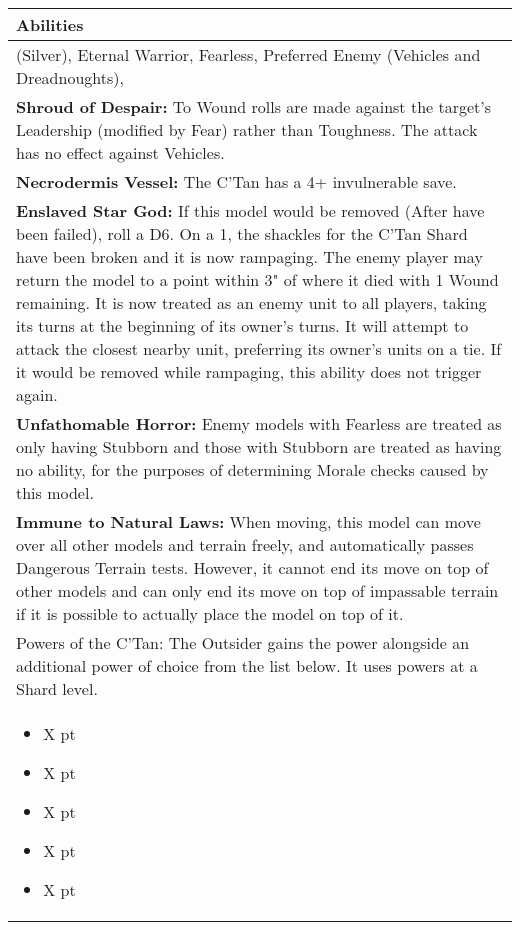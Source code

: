 \noindent
\begin{tabular}{||m{532pt}||}
	\hline
	Abilities \\
	\hline
	\quickref{Awakening Protocols} (Silver), Eternal Warrior, Fearless, Preferred Enemy (Vehicles and Dreadnoughts), \quickref{Reanimation Protocols} \\
	\textbf{Shroud of Despair:} To Wound rolls are made against the target's Leadership (modified by Fear) rather than Toughness. The attack has no effect against Vehicles. \\
	\textbf{Necrodermis Vessel:} The C'Tan has a 4+ invulnerable save. \\
	\textbf{Enslaved Star God:} If this model would be removed (After \quickref{Reanimation Protocols} have been failed), roll a D6. On a 1, the shackles for the C'Tan Shard have been broken and it is now rampaging. The enemy player may return the model to a point within 3" of where it died with 1 Wound remaining. It is now treated as an enemy unit to all players, taking its turns at the beginning of its owner's turns. It will attempt to attack the closest nearby unit, preferring its owner's units on a tie. If it would be removed while rampaging, this ability does not trigger again. \\
	\textbf{Unfathomable Horror:} Enemy models with Fearless are treated as only having Stubborn and those with Stubborn are treated as having no ability, for the purposes of determining Morale checks caused by this model. \\
	\textbf{Immune to Natural Laws:} When moving, this model can move over all other models and terrain freely, and automatically passes Dangerous Terrain tests. However, it cannot end its move on top of other models and can only end its move on top of impassable terrain if it is possible to actually place the model on top of it. \\
	Powers of the C'Tan: The Outsider gains the \quickref{Gaze of the Abyss} power alongside an additional power of choice from the list below. It uses powers at a Shard level. \\
	\begin{itemize}
		\item \quickref{Antimatter Meteor} \hrulefill X pt
		\item \quickref{Cosmic Fire} \hrulefill X pt
		\item \quickref{Entropic Touch} \hrulefill X pt
		\item \quickref{Moulder of Worlds} \hrulefill X pt
		\item \quickref{Pyreshards} \hrulefill X pt

\end{itemize}
\end{tabular}
